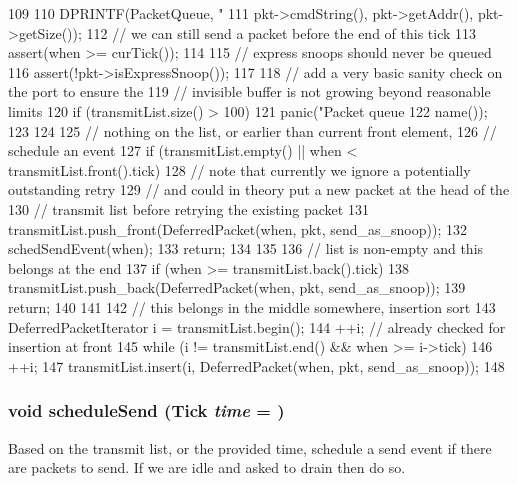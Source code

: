 \begin{DoxyCode}
109 {
110     DPRINTF(PacketQueue, "%
111             pkt->cmdString(), pkt->getAddr(), pkt->getSize());
112     // we can still send a packet before the end of this tick
113     assert(when >= curTick());
114 
115     // express snoops should never be queued
116     assert(!pkt->isExpressSnoop());
117 
118     // add a very basic sanity check on the port to ensure the
119     // invisible buffer is not growing beyond reasonable limits
120     if (transmitList.size() > 100) {
121         panic("Packet queue %
122               name());
123     }
124 
125     // nothing on the list, or earlier than current front element,
126     // schedule an event
127     if (transmitList.empty() || when < transmitList.front().tick) {
128         // note that currently we ignore a potentially outstanding retry
129         // and could in theory put a new packet at the head of the
130         // transmit list before retrying the existing packet
131         transmitList.push_front(DeferredPacket(when, pkt, send_as_snoop));
132         schedSendEvent(when);
133         return;
134     }
135 
136     // list is non-empty and this belongs at the end
137     if (when >= transmitList.back().tick) {
138         transmitList.push_back(DeferredPacket(when, pkt, send_as_snoop));
139         return;
140     }
141 
142     // this belongs in the middle somewhere, insertion sort
143     DeferredPacketIterator i = transmitList.begin();
144     ++i; // already checked for insertion at front
145     while (i != transmitList.end() && when >= i->tick)
146         ++i;
147     transmitList.insert(i, DeferredPacket(when, pkt, send_as_snoop));
148 }
\end{DoxyCode}
\hypertarget{classPacketQueue_a34d5599fd6c275e889527628932a224e}{
\subsubsection[{scheduleSend}]{\setlength{\rightskip}{0pt plus 5cm}void scheduleSend ({\bf Tick} {\em time} = {})}}
\label{classPacketQueue_a34d5599fd6c275e889527628932a224e}
Based on the transmit list, or the provided time, schedule a send event if there are packets to send. If we are idle and asked to drain then do so.


